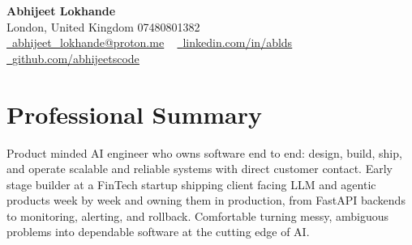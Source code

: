 \documentclass[a4paper,10pt]{article}
\begin{document}
    \begin{center}
        {\Huge\bfseries Abhijeet Lokhande}
        \\[2pt] {\color{muted}London, United Kingdom \textbar{} 07480801382}\\
        \small
        \href{mailto:abhijeet_lokhande@proton.me}{\raisebox{-0.2\height}{\color{primary}\faEnvelope}\  \underline{abhijeet\_lokhande@proton.me}} ~
        \href{https://www.linkedin.com/in/ablds/}{\raisebox{-0.2\height}{\color{primary}\faLinkedin}\ \underline{linkedin.com/in/ablds}}  ~
        \href{https://github.com/abhijeetscode}{\raisebox{-0.2\height}{\color{primary}\faGithub}\ \underline{github.com/abhijeetscode}}
    \end{center}

\section{Professional Summary}
\vspace{-5pt}
{\color{muted}Product minded AI engineer who owns software end to end: design, build, ship, and operate scalable and reliable systems with direct customer contact. Early stage builder at a FinTech startup shipping client facing LLM and agentic products week by week and owning them in production, from FastAPI backends to monitoring, alerting, and rollback. Comfortable turning messy, ambiguous problems into dependable software at the cutting edge of AI.}
\vspace{2pt}

\end{document}
